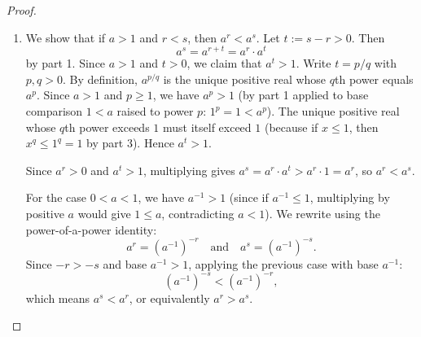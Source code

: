 \begin{proof}
\begin{enumerate}
    \item We show that if $a > 1$ and $r < s$, then $a^r < a^s$. Let $t := s - r > 0$. Then
    $$a^s = a^{r+t} = a^r \cdot a^t$$
    by part 1. Since $a > 1$ and $t > 0$, we claim that $a^t > 1$. Write $t = p/q$ with $p,q > 0$. By definition, $a^{p/q}$ is the unique positive real whose $q$th power equals $a^p$. Since $a > 1$ and $p \geq 1$, we have $a^p > 1$ (by part 1 applied to base comparison $1 < a$ raised to power $p$: $1^p = 1 < a^p$). The unique positive real whose $q$th power exceeds $1$ must itself exceed $1$ (because if $x \leq 1$, then $x^q \leq 1^q = 1$ by part 3). Hence $a^t > 1$.

    Since $a^r > 0$ and $a^t > 1$, multiplying gives $a^s = a^r \cdot a^t > a^r \cdot 1 = a^r$, so $a^r < a^s$.

    For the case $0 < a < 1$, we have $a^{-1} > 1$ (since if $a^{-1} \leq 1$, multiplying by positive $a$ would give $1 \leq a$, contradicting $a < 1$). We rewrite using the power-of-a-power identity:
    $$a^r = \left(a^{-1}\right)^{-r} \quad\text{and}\quad a^s = \left(a^{-1}\right)^{-s}.$$
    Since $-r > -s$ and base $a^{-1} > 1$, applying the previous case with base $a^{-1}$:
    $$\left(a^{-1}\right)^{-s} < \left(a^{-1}\right)^{-r},$$
    which means $a^s < a^r$, or equivalently $a^r > a^s$.
\end{enumerate}
\end{proof}
